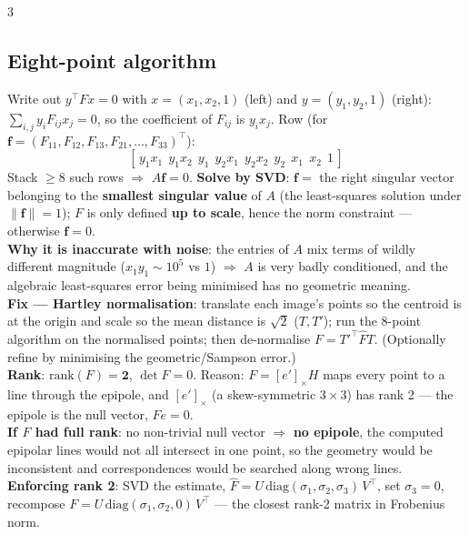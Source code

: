 \documentclass[9pt,a4paper,landscape]{extarticle}
\newcommand{\key}[1]{\textbf{#1}}
\begin{document}
\begin{multicols}{3}
\subsection{Eight-point algorithm}
Write out $y^\top F x=0$ with $x=(x_1,x_2,1)$ (left) and $y=(y_1,y_2,1)$ (right): $\sum_{i,j}y_i F_{ij}x_j=0$, so the coefficient of $F_{ij}$ is $y_ix_j$. Row (for $\mathbf f=(F_{11},F_{12},F_{13},F_{21},\dots,F_{33})^\top$):
$$[\,y_1x_1\ \ y_1x_2\ \ y_1\ \ y_2x_1\ \ y_2x_2\ \ y_2\ \ x_1\ \ x_2\ \ 1\,]$$
Stack $\ge8$ such rows $\Rightarrow$ $A\mathbf f=0$. \key{Solve by SVD}: $\mathbf f=$ the right singular vector belonging to the \key{smallest singular value} of $A$ (the least-squares solution under $\|\mathbf f\|=1$); $F$ is only defined \key{up to scale}, hence the norm constraint --- otherwise $\mathbf f=0$.\\
\key{Why it is inaccurate with noise}: the entries of $A$ mix terms of wildly different magnitude ($x_1y_1\sim10^{5}$ vs $1$) $\Rightarrow$ $A$ is very badly conditioned, and the algebraic least-squares error being minimised has no geometric meaning.\\
\key{Fix --- Hartley normalisation}: translate each image's points so the centroid is at the origin and scale so the mean distance is $\sqrt2$ ($T,T'$); run the 8-point algorithm on the normalised points; then de-normalise $F=T'^\top \hat F T$. (Optionally refine by minimising the geometric/Sampson error.)\\
\key{Rank}: $\mathrm{rank}(F)=\mathbf 2$, $\det F=0$. Reason: $F=[e']_\times H$ maps every point to a line through the epipole, and $[e']_\times$ (a skew-symmetric $3\times3$) has rank 2 --- the epipole is the null vector, $Fe=0$.\\
\key{If $F$ had full rank}: no non-trivial null vector $\Rightarrow$ \key{no epipole}, the computed epipolar lines would not all intersect in one point, so the geometry would be inconsistent and correspondences would be searched along wrong lines.\\
\key{Enforcing rank 2}: SVD the estimate, $\hat F=U\,\mathrm{diag}(\sigma_1,\sigma_2,\sigma_3)\,V^\top$, set $\sigma_3=0$, recompose $F=U\,\mathrm{diag}(\sigma_1,\sigma_2,0)\,V^\top$ --- the closest rank-2 matrix in Frobenius norm.


\end{multicols}
\end{document}
